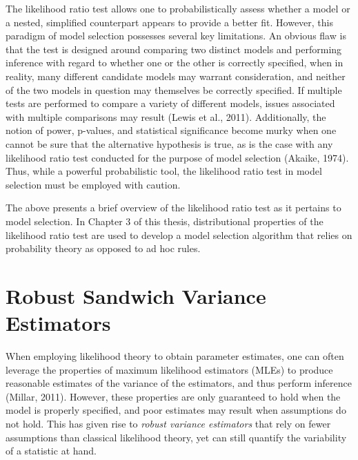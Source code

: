 		The likelihood ratio test allows one to probabilistically assess whether a model or a nested, simplified counterpart appears to provide a better fit. However, this paradigm of model selection possesses
		several key limitations. An obvious flaw is that the test is designed around comparing two distinct models and performing inference with regard to whether one or the other is 
		correctly specified, when in reality, many different candidate models may warrant consideration, and neither of the two models in question may themselves be correctly specified. 
		If multiple tests are performed to compare a variety of different models, issues associated with multiple comparisons may result (Lewis et al., 2011). Additionally, the notion of power, p-values, and statistical significance 
		become murky when one cannot be sure that the alternative hypothesis is true, as is the case with any likelihood ratio test conducted for the purpose of model selection (Akaike, 1974).
		Thus, while a powerful probabilistic tool, the likelihood ratio test in model selection must be employed with caution.

		The above presents a brief overview of the likelihood ratio test as it pertains to model selection. In Chapter 3 of this thesis, distributional properties of the likelihood ratio test are
		used to develop a model selection algorithm that relies on probability theory as opposed to ad hoc rules.

		\section{Robust Sandwich Variance Estimators}

		When employing likelihood theory to obtain parameter estimates, one can often leverage the properties of maximum likelihood estimators (MLEs) to produce reasonable estimates of the variance of the
		estimators, and thus perform inference (Millar, 2011). However, these properties are only guaranteed to hold when the model is properly specified, and poor estimates may result when assumptions
		do not hold. This has given rise to \textit{robust variance estimators} that rely on fewer assumptions than classical likelihood theory, yet can still quantify the variability of a statistic
		at hand.

